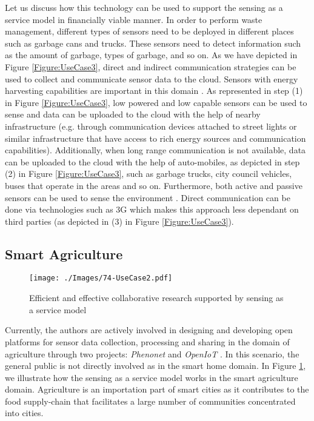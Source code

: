 \documentclass[times]{ettauth}
\begin{document}
Let us discuss how this technology can be used to support the sensing as a service model in financially viable manner. In order to perform waste management, different types of sensors need to be deployed in different places such as garbage cans and trucks. These sensors need to detect information such as the amount of garbage, types of  garbage, and so on. As we have depicted in Figure \ref{Figure:UseCase3}, direct and indirect communication strategies can be used to collect and communicate sensor data to the cloud. Sensors with energy harvesting capabilities are important in this domain \cite{P633}. As represented in step (1) in Figure \ref{Figure:UseCase3}, low powered \cite{P634} and low capable sensors can be used to sense and data can be uploaded to the cloud with the help of nearby infrastructure (e.g. through communication devices attached to street lights or similar infrastructure that have access to rich energy sources and communication capabilities). Additionally, when long range communication is not available, data can be uploaded to the cloud with the help of auto-mobiles, as depicted in step (2) in Figure \ref{Figure:UseCase3}, such as garbage trucks, city council vehicles, buses that operate in the areas and so on. Furthermore, both active and passive sensors can be used to sense the environment \cite{P017}. Direct communication can be done via technologies such as 3G  which makes this approach less dependant on third parties (as depicted in (3) in Figure \ref{Figure:UseCase3}).




\subsection{Smart Agriculture}
\label{sec:Action:Smart_Agriculture}


\begin{figure}[t]
 \centering
\texttt{[image: ./Images/74-UseCase2.pdf]}
\caption{Efficient and effective collaborative research supported by sensing as a service model}
 \label{Figure:UseCase2}	
\end{figure}

Currently, the authors are actively involved in designing and developing open platforms for sensor data collection, processing and sharing in the domain of agriculture through two projects: \textit{Phenonet} \cite{P412} and \textit{OpenIoT} \cite{P377}. In this scenario, the general public is not directly involved as in the smart home domain. In Figure \ref{Figure:UseCase2}, we illustrate how the sensing as a service model works in the smart agriculture domain. Agriculture is an importation part of  smart cities as it contributes to the food supply-chain that facilitates a large number of communities concentrated into cities.
\end{document}
